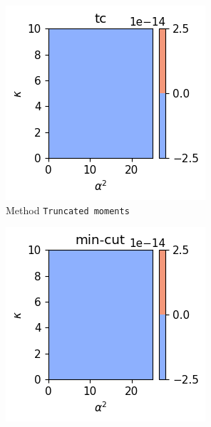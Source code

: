 \begin{figure}[h!]
    \centering
    \begin{subfigure}{0.32\linewidth}
        \centering
        \includegraphics[width=\linewidth]{Pics/H_0_and_losses_deph_p_2_rule_trunc-cumul.pdf}
        \caption{Method \texttt{Truncated moments}}
        \label{fig:H_0_and_losses_deph_p_2_rule_trunc-cumul}
    \end{subfigure}
    \hfill
    \begin{subfigure}{0.32\linewidth}
        \centering
        \includegraphics[width=\linewidth]{Pics/H_0_and_losses_deph_p_2_rule_min-cut.pdf}

\end{subfigure}
\end{figure}
